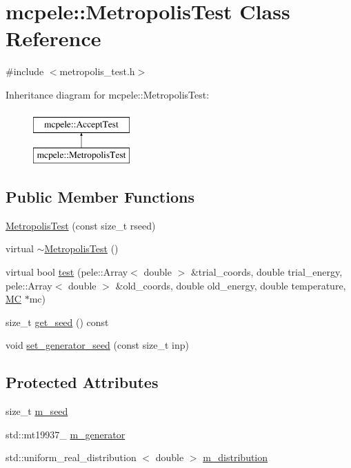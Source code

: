 \hypertarget{classmcpele_1_1MetropolisTest}{\section{mcpele\-:\-:\-Metropolis\-Test \-Class \-Reference}
\label{classmcpele_1_1MetropolisTest}
}


{\ttfamily \#include $<$metropolis\-\_\-test.\-h$>$}

\-Inheritance diagram for mcpele\-:\-:\-Metropolis\-Test\-:\begin{figure}[H]
\begin{center}
\leavevmode
\includegraphics[height=2.000000cm]{classmcpele_1_1MetropolisTest}
\end{center}
\end{figure}
\subsection*{\-Public \-Member \-Functions}
\begin{DoxyCompactItemize}
\item 
\hyperlink{classmcpele_1_1MetropolisTest_a9cf4477f7ddfc2999178d99861f915a2}{\-Metropolis\-Test} (const size\-\_\-t rseed)
\item 
virtual \hyperlink{classmcpele_1_1MetropolisTest_a3c7b3df9ae8624eb3e4e4e2aa94249d0}{$\sim$\-Metropolis\-Test} ()
\item 
virtual bool \hyperlink{classmcpele_1_1MetropolisTest_ae59f0c208bedf4c8e2671c7150f8dcd7}{test} (pele\-::\-Array$<$ double $>$ \&trial\-\_\-coords, double trial\-\_\-energy, pele\-::\-Array$<$ double $>$ \&old\-\_\-coords, double old\-\_\-energy, double temperature, \hyperlink{classmcpele_1_1MC}{\-M\-C} $\ast$mc)
\item 
size\-\_\-t \hyperlink{classmcpele_1_1MetropolisTest_a8f02eef6939b2acc3d2b50af04248dcf}{get\-\_\-seed} () const 
\item 
void \hyperlink{classmcpele_1_1MetropolisTest_a6c1fe3e8acdeb71a806c94cf8318936b}{set\-\_\-generator\-\_\-seed} (const size\-\_\-t inp)
\end{DoxyCompactItemize}
\subsection*{\-Protected \-Attributes}
\begin{DoxyCompactItemize}
\item 
size\-\_\-t \hyperlink{classmcpele_1_1MetropolisTest_aa2973163ef6d8160e5f1d096cc7d4170}{m\-\_\-seed}
\item 
std\-::mt19937\-\_ \hyperlink{classmcpele_1_1MetropolisTest_acf16d24f5b32afb1977c542e20dc23cf}{m\-\_\-generator}
\item 
std\-::uniform\-\_\-real\-\_\-distribution\*
$<$ double $>$ \hyperlink{classmcpele_1_1MetropolisTest_a98284c84912422d5846aef7f21772740}{m\-\_\-distribution}
\end{DoxyCompactItemize}


